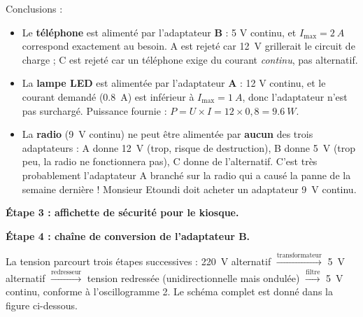 \documentclass[11pt]{article}
\begin{document}
\begin{exoresolu}
Conclusions :
\begin{itemize}
\item Le \textbf{téléphone} est alimenté par l'adaptateur \textbf{B} : 5 V continu, et $I_{\max} = \SI{2}{A}$ correspond exactement au besoin. A est rejeté car \SI{12}{V} grillerait le circuit de charge ; C est rejeté car un téléphone exige du courant \emph{continu}, pas alternatif.
\item La \textbf{lampe LED} est alimentée par l'adaptateur \textbf{A} : 12 V continu, et le courant demandé (\SI{0,8}{A}) est inférieur à $I_{\max} = \SI{1}{A}$, donc l'adaptateur n'est pas surchargé. Puissance fournie : $P = U \times I = 12 \times 0{,}8 = \SI{9,6}{W}$.
\item La \textbf{radio} (\SI{9}{V} continu) ne peut être alimentée par \textbf{aucun} des trois adaptateurs : A donne \SI{12}{V} (trop, risque de destruction), B donne \SI{5}{V} (trop peu, la radio ne fonctionnera pas), C donne de l'alternatif. C'est très probablement l'adaptateur A branché sur la radio qui a causé la panne de la semaine dernière ! Monsieur Etoundi doit acheter un adaptateur \SI{9}{V} continu.
\end{itemize}

\textbf{Étape 3 : affichette de sécurité pour le kiosque.}

\begin{center}
\end{center}

\textbf{Étape 4 : chaîne de conversion de l'adaptateur B.}

La tension parcourt trois étapes successives : \SI{220}{V} alternatif $\xrightarrow{\text{transformateur}}$ \SI{5}{V} alternatif $\xrightarrow{\text{redresseur}}$ tension redressée (unidirectionnelle mais ondulée) $\xrightarrow{\text{filtre}}$ \SI{5}{V} continu, conforme à l'oscillogramme 2. Le schéma complet est donné dans la figure ci-dessous.
\end{exoresolu}
\end{document}
